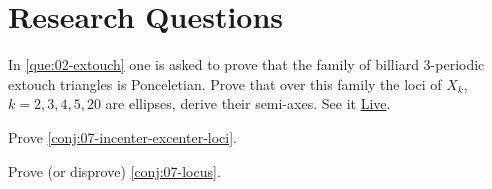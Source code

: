 \section{Research Questions}
\label{sec:07-research}

\begin{question}
In \cref{que:02-extouch} one is asked to prove that the family of billiard 3-periodic extouch triangles is Ponceletian. Prove that over this family the loci of $X_k$, $k=2,3,4,5,20$ are ellipses, derive their semi-axes. See it \href{https://bit.ly/2RdtlvH}{Live}.
\end{question}

\begin{question}
Prove \cref{conj:07-incenter-excenter-loci}.
\end{question}

\begin{question}
Prove (or disprove) \cref{conj:07-locus}.
\end{question}